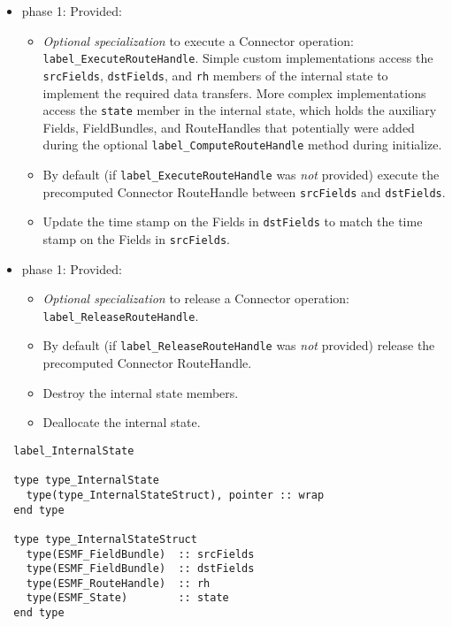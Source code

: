 \begin{itemize}
\item phase 1: {\sc Provided:}
  \begin{itemize}
  \item {\it Optional specialization} to execute a Connector operation: {\tt label\_ExecuteRouteHandle}. Simple custom implementations access the {\tt srcFields}, {\tt dstFields}, and {\tt rh} members of the internal state to implement the required data transfers. More complex implementations access the {\tt state} member in the internal state, which holds the auxiliary Fields, FieldBundles, and RouteHandles that potentially were added during the optional {\tt label\_ComputeRouteHandle} method during initialize.
  \item By default (if {\tt label\_ExecuteRouteHandle} was {\em not} provided) execute the precomputed Connector RouteHandle between {\tt srcFields} and {\tt dstFields}.
  \item Update the time stamp on the Fields in {\tt dstFields} to match the time stamp on the Fields in {\tt srcFields}.
  \end{itemize}    
\end{itemize}

\begin{itemize}
\item phase 1: {\sc Provided:}
  \begin{itemize}
  \item {\it Optional specialization} to release a Connector operation: {\tt label\_ReleaseRouteHandle}.
  \item By default (if {\tt label\_ReleaseRouteHandle} was {\em not} provided) release the precomputed Connector RouteHandle.
  \item Destroy the internal state members.
  \item Deallocate the internal state.
  \end{itemize}      
\end{itemize}

\begin{verbatim}  label_InternalState

  type type_InternalState
    type(type_InternalStateStruct), pointer :: wrap
  end type

  type type_InternalStateStruct
    type(ESMF_FieldBundle)  :: srcFields
    type(ESMF_FieldBundle)  :: dstFields
    type(ESMF_RouteHandle)  :: rh
    type(ESMF_State)        :: state
  end type

\end{verbatim}

